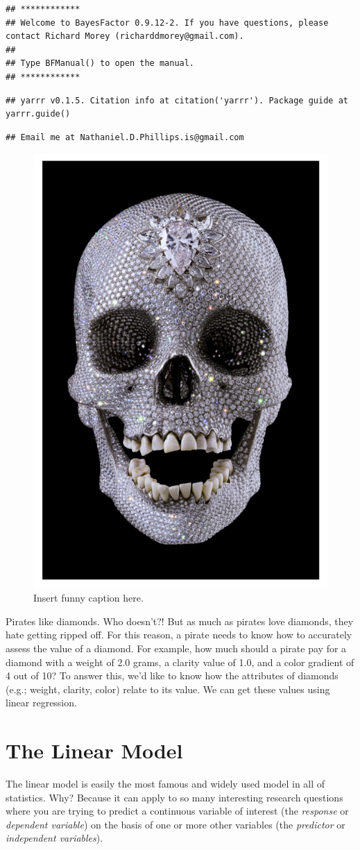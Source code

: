 \documentclass[]{book}
\theoremstyle{definition}
\theoremstyle{definition}
\theoremstyle{remark}
\begin{document}
\begin{verbatim}
## ************
## Welcome to BayesFactor 0.9.12-2. If you have questions, please contact Richard Morey (richarddmorey@gmail.com).
## 
## Type BFManual() to open the manual.
## ************
\end{verbatim}

\begin{verbatim}
## yarrr v0.1.5. Citation info at citation('yarrr'). Package guide at yarrr.guide()
\end{verbatim}

\begin{verbatim}
## Email me at Nathaniel.D.Phillips.is@gmail.com
\end{verbatim}

\begin{figure}

{\centering \includegraphics[width=0.2\linewidth]{images/diamondskull} 

}

\caption{Insert funny caption here.}\label{fig:unnamed-chunk-2}
\end{figure}

Pirates like diamonds. Who doesn't?! But as much as pirates love
diamonds, they hate getting ripped off. For this reason, a pirate needs
to know how to accurately assess the value of a diamond. For example,
how much should a pirate pay for a diamond with a weight of 2.0 grams, a
clarity value of 1.0, and a color gradient of 4 out of 10? To answer
this, we'd like to know how the attributes of diamonds (e.g.; weight,
clarity, color) relate to its value. We can get these values using
linear regression.

\section{The Linear Model}\label{the-linear-model}

The linear model is easily the most famous and widely used model in all
of statistics. Why? Because it can apply to so many interesting research
questions where you are trying to predict a continuous variable of
interest (the \emph{response} or \emph{dependent variable}) on the basis
of one or more other variables (the \emph{predictor} or
\emph{independent variables}).
\end{document}
